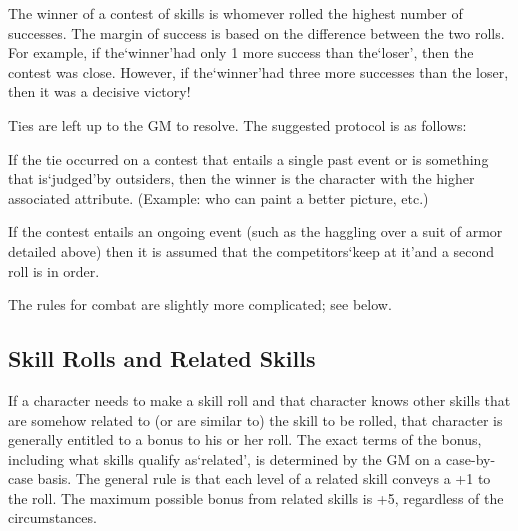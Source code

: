 \documentclass[twoside]{book}
\begin{document}
  
    {  
    The winner of a contest of skills is whomever rolled the highest number of successes. The margin of success is based on the difference between the two rolls. For example, if the`winner'had only 1 more success than the`loser', then the contest was close. However, if the`winner'had three more successes than the loser, then it was a decisive victory!
    }
  
    {  
    Ties are left up to the GM to resolve. The suggested protocol is as follows:
    }
  
    {  
    If the tie occurred on a contest that entails a single past event or is something that is`judged'by outsiders, then the winner is the character with the higher associated attribute. (Example: who can paint a better picture, etc.)
    }
  
    {  
    If the contest entails an ongoing event (such as the haggling over a suit of armor detailed above) then it is assumed that the competitors`keep at it'and a second roll is in order.
    }
  
    {  
    The rules for combat are slightly more complicated; see below.
    }
  
    

\subsection{Skill Rolls and Related Skills}
    
    {  
    If a character needs to make a skill roll and that character knows other skills that are somehow related to (or are similar to) the skill to be rolled, that character is generally entitled to a bonus to his or her roll. The exact terms of the bonus, including what skills qualify as`related', is determined by the GM on a case-by-case basis. The general rule is that each level of a related skill conveys a +1 to the roll. The maximum possible bonus from related skills is +5, regardless of the circumstances.
    }
  
  

  
\end{document}
